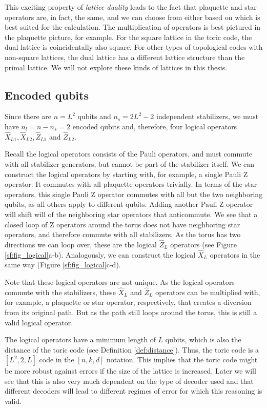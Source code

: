 This exciting property of \emph{lattice duality} leads to the fact that plaquette and star operators are, in fact, the same, and we can choose from either based on which is best suited for the calculation. The multiplication of operators is best pictured in the plaquette picture, for example. For the square lattice in the toric code, the dual lattice is coincidentally also square. For other types of topological codes with non-square lattices, the dual lattice has a different lattice structure than the primal lattice. We will not explore these kinds of lattices in this thesis.

\subsection{Encoded qubits}
Since there are $n = L^2$ qubits and $n_s = 2L^2 - 2$ independent stabilizers, we must have $n_l = n - n_s = 2$ encoded qubits and, therefore, four logical operators $\hat{X}_{L1}, \hat{X}_{L2}, \hat{Z}_{L1}$ and $\hat{Z}_{L2}$.

Recall the logical operators consists of the Pauli operators, and must commute with all stabilizer generators, but cannot be part of the stabilizer itself. We can construct the logical operators by starting with, for example, a single Pauli Z operator. It commutes with all plaquette operators trivially. In terms of the star operators, this single Pauli Z operator commutes with all but the two neighboring qubits, as all others apply to different qubits. Adding another Pauli Z operator will shift will of the neighboring star operators that anticommute. We see that a closed loop of Z operators around the torus does not have neighboring star operators, and therefore commute with all stabilizers. As the torus has two directions we can loop over, these are the logical $\hat{Z}_L$ operators (see Figure \ref{sf:fig_logical}a-b). Analogously, we can construct the logical $\hat{X}_L$ operators in the same way (Figure \ref{sf:fig_logical}c-d).

Note that these logical operators are not unique. As the logical operators commute with the stabilizers, these $\hat{X}_L$ and $\hat{Z}_L$ operators can be multiplied with, for example, a plaquette or star operator, respectively, that creates a diversion from its original path. But as the path still loops around the torus, this is still a valid logical operator.

The logical operators have a minimum length of $L$ qubits, which is also the distance of the toric code (see Definition \ref{def:distance}). Thus, the toric code is a $[L^2,2,L]$ code in the $[n,k,d]$ notation. This implies that the toric code might be more robust against errors if the size of the lattice is increased. Later we will see that this is also very much dependent on the type of decoder used and that different decoders will lead to different regimes of error for which this reasoning is valid.


